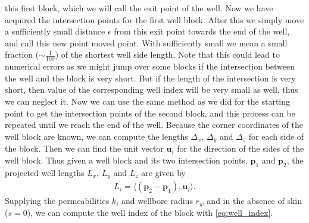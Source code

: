 this first block, which we will call the exit point of the well.
Now we have acquired the intersection points for the first well 
block. After this we simply move a sufficiently small 
distance $\epsilon$ from this exit point towards the end of 
the well, and call this new point moved point. With sufficiently
small we mean a small fraction ($\sim \frac{1}{100}$) of the shortest
well side length. Note that this could lead to numerical errors as
we might jump over some blocks if the intersection between the 
well and the block is very short. But if the length of the
intersection is very short, then value of the corresponding well 
index will be very small as well, thus we can neglect it. 
%
Now we can use
the same method as we did for the starting point to get the
intersection points of the second block, and this process can
be repeated until we reach the end of the well.
%
%
Because the corner coordinates of the well block are known, we can compute
the lengths $\Delta_x$, $\Delta_y$ and $\Delta_z$ for each side of the block.
Then we can find the unit vector $\textbf{u}_i$ for the direction of the sides
of the well block. Thus given a well block and its two intersection points,
$\textbf{p}_1$ and $\textbf{p}_2$, the projected well lengths $L_x$, $L_y$ 
and $L_z$ are given by 
%
\begin{align}
L_i = \big\langle (\textbf{p}_2 - \textbf{p}_1), \textbf{u}_i \big\rangle.
\end{align}
%
Supplying the permeabilities $k_i$ and wellbore radius $r_w$ and in the absence
of skin ($s = 0$), we can compute the well index of the block with \eqref{eq:well_index}.
%